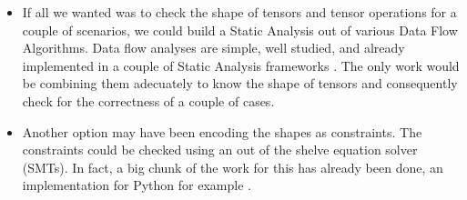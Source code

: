 \begin{itemize}
\tightlist
\item
  If all we wanted was to check the shape of tensors and tensor
  operations for a couple of scenarios, we could build a Static Analysis
  out of various Data Flow Algorithms. Data flow analyses are simple,
  well studied, and already implemented in a couple of Static Analysis
  frameworks {}. The only work would be combining them adecuately to know the
  shape of tensors and consequently check for the correctness of a
  couple of cases.
\item
  Another option may have been encoding the shapes as constraints. The
  constraints could be checked using an out of the shelve equation
  solver (SMTs). In fact, a big chunk of the work for this has already
  been done, an implementation for Python for example {}.
\end{itemize}
